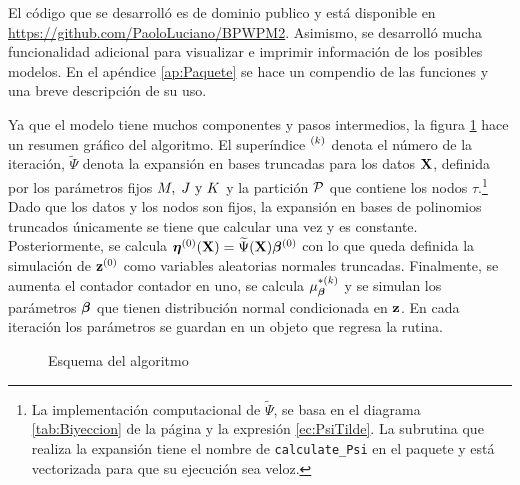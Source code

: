 \documentclass[../Main/Main.tex]{subfiles}
\begin{document}
El código que se desarrolló es de dominio publico y está disponible en \url{https://github.com/PaoloLuciano/BPWPM2}. Asimismo, se desarrolló mucha funcionalidad adicional para visualizar e imprimir información de los posibles modelos. En el apéndice \ref{ap:Paquete} se hace un compendio de las funciones y una breve descripción de su uso. 

Ya que el modelo tiene muchos componentes y pasos intermedios, la figura \ref{fig:DiagramaAlgoritmo} hace un resumen gráfico del algoritmo. El superíndice $\iter{k}$ denota el número de la iteración, $\widetilde{\Psi}$ denota la expansión en bases truncadas para los datos $\xmat$,  definida por los parámetros fijos $\MJK$ y la partición $\P$ que contiene los nodos $\tau$.\footnote{La implementación computacional de $\widetilde{\Psi}$, se basa en el diagrama \ref{tab:Biyeccion} de la página \pageref{tab:Biyeccion} y la expresión \eqref{ec:PsiTilde}. La subrutina que realiza la expansión tiene el nombre de \texttt{calculate\_Psi} en el paquete y está vectorizada para que su ejecución sea veloz.} Dado que los datos y los nodos son fijos, la expansión en bases de polinomios truncados únicamente se tiene que calcular una vez y es constante. Posteriormente, se calcula $\bm{\eta}\iter{0}(\xmat) = \widetilde{\Psi}(\xmat)\betabf\iter{0}$ con lo que queda definida la simulación de $\zsn\iter{0}$ como variables aleatorias normales truncadas. Finalmente, se aumenta el contador contador en uno, se calcula $\mu_{\betabf}^{*(k)}$ y se simulan los parámetros $\betabf$ que tienen distribución normal condicionada en $\zsn$. En cada iteración los parámetros se guardan en un objeto que regresa la rutina. 
\begin{figure}[h]
\centering
{}
\caption{Esquema del algoritmo}
\label{fig:DiagramaAlgoritmo}
\end{figure}
\end{document}
